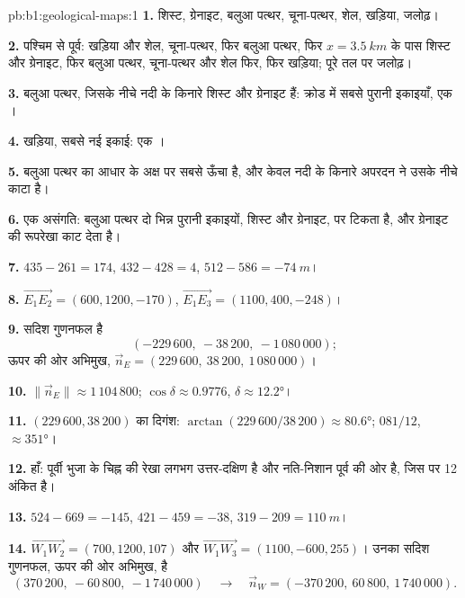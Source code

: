 \begin{solution}{pb:b1:geological-maps:1}
\textbf{1.} शिस्ट, ग्रेनाइट, बलुआ पत्थर, चूना-पत्थर, शेल, खड़िया, जलोढ़।

\textbf{2.} पश्चिम से पूर्व: खड़िया और शेल, चूना-पत्थर, फिर बलुआ पत्थर, फिर $x = \qty{3.5}{km}$ के पास शिस्ट और
ग्रेनाइट, फिर बलुआ पत्थर, चूना-पत्थर और शेल फिर, फिर खड़िया; पूरे तल पर जलोढ़।

\textbf{3.} बलुआ पत्थर, जिसके नीचे नदी के किनारे शिस्ट और ग्रेनाइट हैं: क्रोड में सबसे पुरानी इकाइयाँ, एक ।

\textbf{4.} खड़िया, सबसे नई इकाई: एक ।

\textbf{5.} बलुआ पत्थर का आधार  के अक्ष पर सबसे ऊँचा है, और केवल नदी के किनारे अपरदन ने उसके नीचे काटा है।

\textbf{6.} एक असंगति: बलुआ पत्थर दो भिन्न पुरानी इकाइयों, शिस्ट और ग्रेनाइट, पर टिकता है, और ग्रेनाइट की रूपरेखा
काट देता है।

\textbf{7.} $435 - 261 = 174$, $432 - 428 = 4$, $512 - 586 = \qty{-74}{m}$।

\textbf{8.} $\overrightarrow{E_1E_2} = (600, 1200, -170)$,
$\overrightarrow{E_1E_3} = (1100, 400, -248)$।

\textbf{9.} सदिश गुणनफल है
\[
  (-229\,600,\ -38\,200,\ -1\,080\,000);
\]
ऊपर की ओर अभिमुख, $\vec n_E = (229\,600,\ 38\,200,\ 1\,080\,000)$।

\textbf{10.} $\|\vec n_E\| \approx 1\,104\,800$; $\cos\delta \approx 0.9776$,
$\delta \approx \ang{12.2}$।

\textbf{11.} $(229\,600, 38\,200)$ का दिगंश: $\arctan(229\,600/38\,200)
\approx \ang{80.6}$;  $081/12$,  $\approx \ang{351}$।

\textbf{12.} हाँ: पूर्वी भुजा के चिह्न की  रेखा लगभग उत्तर-दक्षिण है और नति-निशान पूर्व की ओर है, जिस पर 12 अंकित है।

\textbf{13.} $524 - 669 = -145$, $421 - 459 = -38$, $319 - 209 =
\qty{110}{m}$।

\textbf{14.} $\overrightarrow{W_1W_2} = (700, 1200, 107)$ और
$\overrightarrow{W_1W_3} = (1100, -600, 255)$। उनका सदिश गुणनफल, ऊपर की ओर अभिमुख, है
\[
  (370\,200,\ -60\,800,\ -1\,740\,000) \quad\longrightarrow\quad
  \vec n_W = (-370\,200,\ 60\,800,\ 1\,740\,000).
\]


\end{solution}
